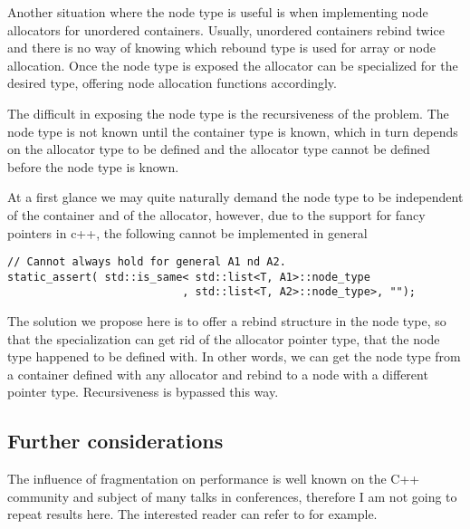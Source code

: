 \documentclass[11pt]{article}
\begin{document}
Another situation where the node type is useful is when implementing node
allocators for unordered containers. Usually, unordered containers rebind
twice and there is no way of knowing which rebound type is used for array or
node allocation. Once the node type is exposed the allocator can be specialized
for the desired type, offering node allocation functions accordingly.

The difficult in exposing the node type is the recursiveness of the problem.
The node type is not known until the container type is known, which in turn depends
on the allocator type to be defined and the allocator type cannot be
defined before the node type is known.

At a first glance we may quite naturally demand the node type to be independent
of the container and of the allocator, however, due to the support for fancy pointers
in c++, the following cannot be implemented in general
\begin{lstlisting}
// Cannot always hold for general A1 nd A2.
static_assert( std::is_same< std::list<T, A1>::node_type
                           , std::list<T, A2>::node_type>, "");
\end{lstlisting}

The solution we propose here is to offer a rebind structure in the node type,
so that the specialization can get rid of the allocator pointer type, that
the node type happened to be defined with.  In other words, we can get the
node type from a container defined with any allocator and rebind to a node
with a different pointer type. Recursiveness is bypassed this way.

%


\subsection{Further considerations}
The influence of fragmentation on performance is well known on the C++
community and subject of many talks in conferences, therefore I am not going to
repeat results here. The interested reader can
refer to \cite{chandler, meyers} for example.
\end{document}
